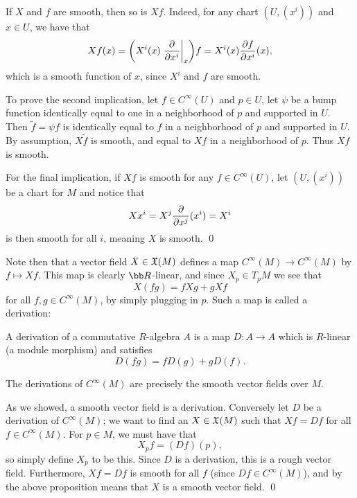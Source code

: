\eprop

\bproof

    If $X$ and $f$ are smooth, then so is $Xf$.
    Indeed, for any chart $(U,(x^i))$ and $x\in U$, we have that
    $$ Xf(x) = \mathopen{}\mathclose{\left(X^i(x)\left.{{\partial }\over{\partial x^i}}\right|_x\right)}f = X^i(x){{\partial f}\over{\partial x^i}}(x) , $$
    which is a smooth function of $x$, since $X^i$ and $f$ are smooth.

    To prove the second implication, let $f\in C^\infty(U)$ and $p\in U$, let $\psi$ be a bump function identically equal to one in a neighborhood
    of $p$ and supported in $U$.
    Then $\tilde f=\psi f$ is identically equal to $f$ in a neighborhood of $p$ and supported in $U$.
    By assumption, $X\tilde f$ is smooth, and equal to $Xf$ in a neighborhood of $p$.
    Thus $Xf$ is smooth.

    For the final implication, if $Xf$ is smooth for any $f\in C^\infty(U)$, let $(U,(x^i))$ be a chart for $M$ and notice that
    $$ Xx^i = X^j{{\partial }\over{\partial x^j}}(x^i) = X^i $$
    is then smooth for all $i$, meaning $X$ is smooth.
    \qed

\eproof

Note then that a vector field $X\in{\frak X}(M)$ defines a map $C^\infty(M)\to C^\infty(M)$ by $f\mapsto Xf$.
This map is clearly $\bR$-linear, and since $X_p\in T_pM$ we see that
$$ X(fg) = fXg + gXf $$
for all $f,g\in C^\infty(M)$, by simply plugging in $p$.
Such a map is called a {\emphcolor derivation}:

\bdefn

    A {\emphcolor derivation} of a commutative $R$-algebra $A$ is a map $D\colon A\to A$ which is $R$-linear (a module morphism) and satisfies
    $$ D(fg) = fD(g) + gD(f) . $$

\edefn

\bprop

    The derivations of $C^\infty(M)$ are precisely the smooth vector fields over $M$.

\eprop

\bproof

    As we showed, a smooth vector field is a derivation.
    Conversely let $D$ be a derivation of $C^\infty(M)$; we want to find an $X\in{\frak X}(M)$ such that $Xf=Df$ for all $f\in C^\infty(M)$.
    For $p\in M$, we must have that
    $$ X_pf = (Df)(p) , $$
    so simply define $X_p$ to be this.
    Since $D$ is a derivation, this is a rough vector field.
    Furthermore, $Xf=Df$ is smooth for all $f$ (since $Df\in C^\infty(M)$), and by the above proposition means that $X$ is a smooth vector
    field.
    \qed


